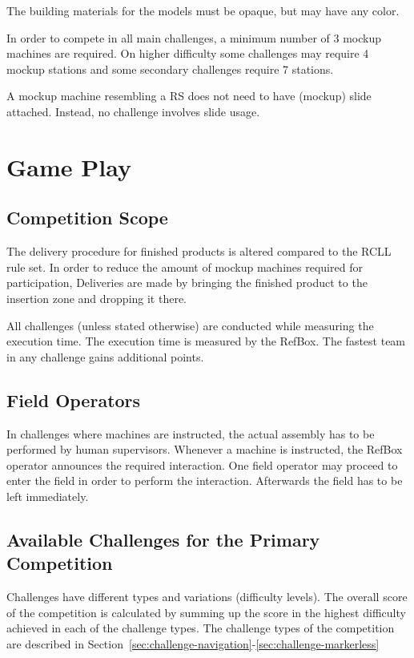 \documentclass[12pt,twoside]{article}
\newcommand{\refsec}[1]{Section~\ref{#1}}
\begin{document}
The building materials for the models must be opaque, but may have any color.

In order to compete in all main challenges, a minimum number of 3 mockup
machines are required. On higher difficulty some challenges may require
4 mockup stations and some secondary challenges require 7 stations.

A mockup machine resembling a \ac{RS} does not need to have (mockup) slide
attached. Instead, no challenge involves slide usage.
\section{Game Play}
\subsection{Competition Scope}

The delivery procedure for finished products is altered compared to the
\ac{RCLL} rule set. In order to reduce the amount of mockup machines required
for participation, Deliveries are made by bringing the finished product
to the insertion zone and dropping it there.

All challenges (unless stated otherwise) are conducted while measuring
the execution time. The execution time is measured by the RefBox.
The fastest team in any challenge gains additional points.

\subsection{Field Operators}
In challenges where machines are instructed, the actual assembly has to be
performed by human supervisors. Whenever a machine is instructed, the RefBox
operator announces the required interaction. One field operator may proceed
to enter the field in order to perform the interaction. Afterwards the field
has to be left immediately.

\subsection{Available Challenges for the Primary Competition}
Challenges have different types and variations (difficulty levels).
The overall score of the competition is calculated by summing up the score
in the highest difficulty achieved in each of the challenge types.
The challenge types of the competition are described in
\refsec{sec:challenge-navigation}-\ref{sec:challenge-markerless}
\end{document}

